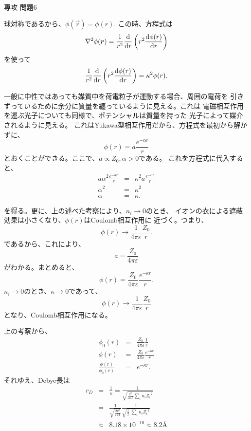 \documentclass[fleqn]{jbook}
\begin{document}
\begin{answer}{専攻 問題6}{}
\begin{subanswers}
\SubAnswer

球対称であるから、$ \phi(\Vec r) = \phi(r).$
この時、方程式は
\[
\nabla^2 \phi(\Vec r) = \frac{1}{r^2} \frac{\d}{\d r} \left(
r^2 \frac{\d \phi(r)}{\d r} \right)
\]
を使って
\[
\frac{1}{r^2} \frac{\d}{\d r} \left( r^2 \frac{\d \phi(r)}
{\d r} \right) = \kappa^2 \phi(r).
\]

一般に中性ではあっても媒質中を荷電粒子が運動する場合、周囲の電荷を
引きずっているために余分に質量を纏っているように見える。これは
電磁相互作用を運ぶ光子についても同様で、ポテンシャルは質量を持った
光子によって媒介されるように見える。
これはYukawa型相互作用だから、方程式を最初から解かずに、
\[ \phi(r) = a \frac{e^{-\alpha r}}{r} \]
とおくことができる。ここで、$ a \propto Z_0, \alpha > 0$である。
これを方程式に代入すると、
\begin{eqnarray*}
a \alpha^2 \frac{e^{-\alpha r}}{r} &=& \kappa^2 a \frac{e^{-\alpha r}}{r} \\
\alpha^2 &=& \kappa^2 \\
\alpha &=& \kappa. 
\end{eqnarray*}

を得る。更に、上の述べた考察により、$n_i \rightarrow 0$のとき、
イオンの衣による遮蔽効果は小さくなり、$\phi(r)$はCoulomb相互作用に
近づく。つまり、
\[ \phi(r) \rightarrow \frac{1}{4 \pi \varepsilon} \frac{Z_0}{r}. \]
であるから、これにより、
\[ a = \frac{Z_0}{4 \pi \varepsilon} \]
がわかる。まとめると、
\[ \phi(r) = \frac{Z_0}{4 \pi \varepsilon} \frac{e^{-\kappa r}}{r}.\]
$n_i \rightarrow 0$のとき、$\kappa \rightarrow 0$であって、
\[ \phi(r) \rightarrow \frac{1}{4 \pi \varepsilon} \frac{Z_0}{r}\]
となり、Coulomb相互作用になる。

\SubAnswer

上の考察から、
\begin{eqnarray*}
\phi_0(r) &=& \frac{Z_0}{4 \pi \varepsilon} \frac{1}{r} \\
\phi(r) &=& \frac{Z_0}{4 \pi \varepsilon} \frac{e^{-\kappa r}}{r} \\
\frac{\phi(r)}{\phi_0(r)} &=& e^{-\kappa r}.
\end{eqnarray*}
それゆえ、Debye長は
\begin{eqnarray*}
r_D &=& \frac{1}{\kappa} 
= \frac{1}{\sqrt{\displaystyle{\frac{q^2}{\varepsilon kT}} \sum_i n_i {Z_i}^2} }\\
&=& \frac{1}{\sqrt{\displaystyle{\frac{2 q^2}{\varepsilon kT}}}} \frac{1}{\sqrt{
\displaystyle{\frac{1}{2}}{\
\sum_i n_i {Z_i}^2}}} \\
&\approx& 8.18 \times 10^{-10} \approx 8.2 \mbox{\AA}
\end{eqnarray*}


\end{subanswers}
\end{answer}
\end{document}
